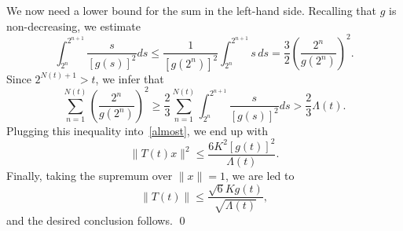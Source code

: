 \documentclass[12pt]{amsart}
\theoremstyle{plain}
\theoremstyle{definition}
\numberwithin{equation}{section}
\begin{document}
We now need a lower bound for the sum in the left-hand side.
Recalling that $g$ is non-decreasing, we estimate
$$
\int_{2^{n}}^{2^{n+1}}\frac{s}{[g(s)]^2} ds \leq \frac{1}{[g(2^{n})]^2}
\int_{2^{n}}^{2^{n+1}}s\, ds  =  \frac32 \left(\frac{2^n}{g(2^n)}\right)^2.
$$
Since $2^{N(t)+1}>t$, we infer that
$$
\sum_{n=1}^{N(t)}\left(\frac{2^n}{g(2^n)}\right)^2 \geq
\frac23 \sum_{n=1}^{N(t)} \int_{2^{n}}^{2^{n+1}}\frac{s}{[g(s)]^2} ds > \frac23 \Lambda(t).
$$
Plugging this inequality into~\eqref{almost}, we end up with
$$
\|T(t)x\|^2
\leq \frac{6 K^2[g(t)]^2}{\Lambda(t)}.
$$
Finally, taking the supremum over $\|x\|=1$, we are led to
$$
\|T(t)\|
\leq \frac{\sqrt{6} K g(t)}{\sqrt{\Lambda(t)}},
$$
and the desired conclusion follows.
\qed


\end{document}
